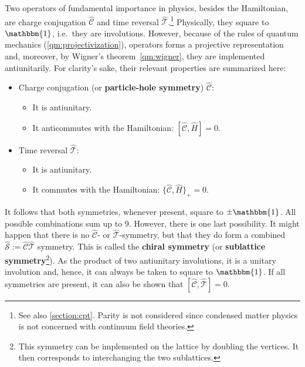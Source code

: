     Two operators of fundamental importance in physics, besides the Hamiltonian, are charge conjugation $\widehat{\mathcal{C}}$ and time reversal $\widehat{\mathcal{T}}$.\footnote{See also \cref{section:cpt}. Parity is not considered since condensed matter physics is not concerned with continuum field theories.} Physically, they square to $\mathbbm{1}$, i.e.~they are involutions. However, because of the rules of quantum mechanics (\cref{qm:projectivization}), operators forms a projective representation and, moreover, by Wigner's theorem~\ref{qm:wigner}, they are implemented antiunitarily. For clarity's sake, their relevant properties are summarized here:
    \begin{itemize}
        \item Charge conjugation (or \textbf{particle-hole symmetry}) $\widehat{\mathcal{C}}$:
        \begin{itemize}
            \item It is antiunitary.
            \item It anticommutes with the Hamiltonian: $[\widehat{\mathcal{C}},\widehat{H}]=0$.
        \end{itemize}
        \item Time reversal $\widehat{\mathcal{T}}$:
        \begin{itemize}
            \item It is antiunitary.
            \item It commutes with the Hamiltonian: $\{\widehat{\mathcal{C}},\widehat{H}\}_+=0$.
        \end{itemize}
    \end{itemize}
    It follows that both symmetries, whenever present, square to $\pm\mathbbm{1}$. All possible combinations sum up to 9. However, there is one last possibility. It might happen that there is no $\widehat{\mathcal{C}}$- or $\widehat{\mathcal{T}}$-symmetry, but that they do form a combined $\widehat{\mathcal{S}} := \widehat{\mathcal{C}}\widehat{\mathcal{T}}$ symmetry. This is called the \textbf{chiral symmetry} (or \textbf{sublattice symmetry}\footnote{This symmetry can be implemented on the lattice by doubling the vertices. It then corresponds to interchanging the two sublattices.}). As the product of two antiunitary involutions, it is a unitary involution and, hence, it can always be taken to square to $\mathbbm{1}$. If all symmetries are present, it can also be shown that $[\widehat{\mathcal{C}},\widehat{\mathcal{T}}]=0$.

